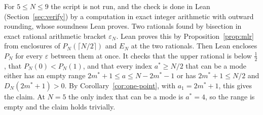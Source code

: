 For $5\le N\le9$ the script is not run, and the check is done in Lean
(Section~\ref{sec:verify}) by a computation in exact integer arithmetic with
outward rounding, whose soundness Lean proves. Two rationals found by bisection
in exact rational arithmetic bracket $\varepsilon_N$. Lean proves this by Proposition~\ref{prop:mlr}
from enclosures of $P_N(\lceil N/2\rceil)$ and $E_N$ at the two rationals. Then
Lean encloses $P_N$ for every $\varepsilon$ between them at once. It checks that the
upper rational is below $\frac12$, that $P_N(0)<P_N(1)$, and that every index
$a^*\ge N/2$ that can be a mode either has an empty range
$2m^*+1\le a\le N-2m^*-1$ or has $2m^*+1\le N/2$ and $D_N(2m^*+1)>0$. By
Corollary~\ref{cor:one-point}, with $a_1=2m^*+1$, this gives the claim. At $N=5$
the only index that can be a mode is $a^*=4$, so the range is empty and the claim
holds trivially.
